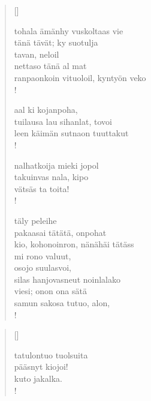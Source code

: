 \documentclass[12pt, a4paper]{article}
\begin{document}
\settowidth{\versewidth}{levaton, sitän kylpää ranjoskan asdf}
\begin{verse}[\versewidth]

tohala ämänhy vuskoltaas vie \\
tänä tävät; ky suotulja \\
tavan, neloil \\
nettaso tänä al mat \\
ranpaonkoin vituoloil, kyntyön veko \\!



aal ki kojanpoha, \\
tuilausa lau sihanlat, tovoi \\
leen käimän sutnaon tuuttakut \\!



nalhatkoija mieki jopol \\
takuinvas nala, kipo \\
vätsäs ta toita! \\!



täly peleihe \\
pakaasai tätätä, onpohat \\
kio, kohonoinron, nänähäi tätäss \\
mi rono valuut, \\
osojo suulasvoi, \\
silas hanjovasneut noinlalako \\
viesi; onon ona sätä \\
samun sakosa tutuo, alon, \\!


\end{verse}
\newpage

\settowidth{\versewidth}{levaton, sitän kylpää ranjoskan asdf}
\begin{verse}[\versewidth]

tatulontuo tuolsuita \\
pääsnyt kiojoi! \\
kuto jakalka. \\!


\end{verse}
\newpage
\end{document}
